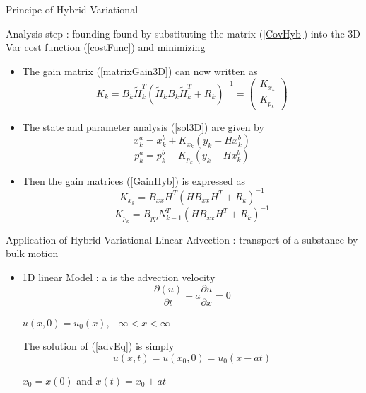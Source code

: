 \documentclass{beamer}
\begin{document}
\begin{frame}{Principe of Hybrid Variational}

Analysis step : founding found by substituting the matrix (\ref{CovHyb}) into the 3D Var cost function (\ref{costFunc}) and minimizing

\begin{itemize}
            \item The gain matrix (\ref{matrixGain3D}) can now written as 
            \begin{equation}
            K_k   =   B_k \tilde H_k^T(  \tilde H_k B_k \tilde H_k^T + R_k)^{-1} = \begin{pmatrix}
            K_{x_k} \\
            K_{p_k} 
            \end{pmatrix} 
            \label{GainHyb}
            \end{equation}
    \item The state and parameter analysis (\ref{sol3D}) are given by 
        \begin{equation}
            x_k^a = x_k^b + K_{x_k} (y_k -  Hx_k^b) 
        \end{equation}
        \begin{equation}
            p_k^a = p_k^b + K_{p_k} (y_k -  Hx_k^b)
        \end{equation}
    \item Then the gain matrices (\ref{GainHyb}) is expressed as 
        \begin{equation}
        K_{x_k} = B_{xx} H^T ( HB_{xx} H^T + R_k)^{-1}
        \end{equation}
        \begin{equation}
        K_{p_k} = B_{pp} N_{k-1}^T ( HB_{xx} H^T + R_k)^{-1}
        \end{equation}

\end{itemize}
\end{frame}
\begin{frame}{Application of Hybrid Variational}
Linear Advection : transport of a substance by bulk motion \\

\begin{itemize}
    \item 1D linear  Model : a is the advection velocity
\begin{equation}
\frac{\partial(u)}{\partial t} + a \frac{\partial u}{ \partial x} = 0  
\label{advEq}
\end{equation}

\begin{center}
   $u(x,0) = u_0(x)  , -\infty < x < \infty$
\end{center}

The solution of (\ref{advEq}) is simply 
\begin{equation}
u(x,t) = u(x_0,0) = u_0(x-at)
\label{solAdv}
\end{equation}
\begin{center}
    $x_0 = x(0)$ and $x(t) = x_0 + at$
\end{center}
\end{itemize}
\end{frame}
\end{document}
